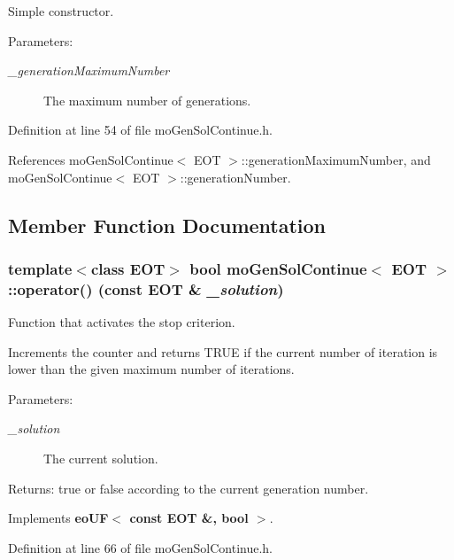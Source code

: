 Simple constructor. 

\begin{Desc}
\item[Parameters:]
\begin{description}
\item[{\em \_\-generation\-Maximum\-Number}]The maximum number of generations. \end{description}
\end{Desc}


Definition at line 54 of file mo\-Gen\-Sol\-Continue.h.

References mo\-Gen\-Sol\-Continue$<$ EOT $>$::generation\-Maximum\-Number, and mo\-Gen\-Sol\-Continue$<$ EOT $>$::generation\-Number.

\subsection{Member Function Documentation}
\subsubsection{\setlength{\rightskip}{0pt plus 5cm}template$<$class EOT$>$ bool {\bf mo\-Gen\-Sol\-Continue}$<$ EOT $>$::operator() (const EOT \& {\em \_\-solution})\hspace{0.3cm}{\tt  [inline, virtual]}}\label{classmo_gen_sol_continue_a1}


Function that activates the stop criterion. 

Increments the counter and returns TRUE if the current number of iteration is lower than the given maximum number of iterations.

\begin{Desc}
\item[Parameters:]
\begin{description}
\item[{\em \_\-solution}]The current solution. \end{description}
\end{Desc}
\begin{Desc}
\item[Returns:]true or false according to the current generation number. \end{Desc}


Implements {\bf eo\-UF$<$ const EOT \&, bool $>$}.

Definition at line 66 of file mo\-Gen\-Sol\-Continue.h.

